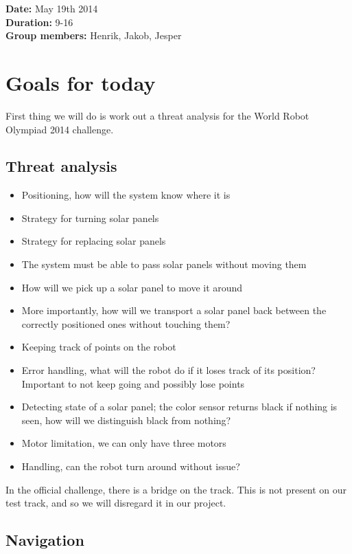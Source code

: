 \textbf{Date:} May 19th 2014\\\textbf{Duration:} 9-16\\\textbf{Group
members:} Henrik, Jakob, Jesper

\section*{Goals for today}

First thing we will do is work out a threat analysis for the World Robot
Olympiad 2014 challenge.

\subsection{Threat analysis}

\begin{itemize}
\itemsep1pt\parskip0pt
\item  Positioning, how will the system know where it is
\item  Strategy for turning solar panels
\item  Strategy for replacing solar panels
\item  The system must be able to pass solar panels without moving them
\item  How will we pick up a solar panel to move it around
\item  More importantly, how will we transport a solar panel back between the
  correctly positioned ones without touching them?
\item  Keeping track of points on the robot
\item  Error handling, what will the robot do if it loses track of its
  position? Important to not keep going and possibly lose points
\item  Detecting state of a solar panel; the color sensor returns black if
  nothing is seen, how will we distinguish black from nothing?
\item  Motor limitation, we can only have three motors
\item  Handling, can the robot turn around without issue?
\end{itemize}

In the official challenge, there is a bridge on the track. This is not
present on our test track, and so we will disregard it in our project.

\subsection{Navigation}

